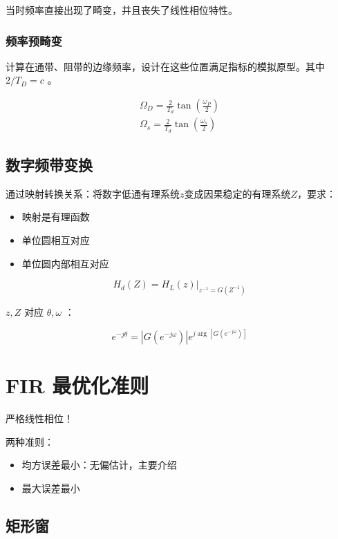 \documentclass[cn,11pt,chinese,black,simple]{elegantbook}
\begin{document}
当时频率直接出现了畸变，并且丧失了线性相位特性。

\subsubsection{频率预畸变}

计算在通带、阻带的边缘频率，设计在这些位置满足指标的模拟原型。其中 \( 2 / T_D = c\) 。

\[
    \begin{array}{l}
        \Omega_{D}=\frac{2}{T_{d}} \tan \left(\frac{\omega_{P}}{2}\right) \\
        \Omega_{s}=\frac{2}{T_{d}} \tan \left(\frac{\omega_{s}}{2}\right)
        \end{array}\]

\subsection{数字频带变换}

通过映射转换关系：将数字低通有理系统\(z\)变成因果稳定的有理系统\(Z\)，要求：

\begin{itemize}
    \item 映射是有理函数
    \item 单位圆相互对应
    \item 单位圆内部相互对应
\end{itemize}

\[
    H_{d}(Z)=\left.H_{L}(z)\right|_{z^{-1}=G\left(Z^{-1}\right)}\]

\(z, Z\) 对应 \(\theta, \omega\) ：

\[
e^{-j \theta}=\left|G\left(e^{-j \omega}\right)\right| e^{j \arg \left[G\left(e^{-j \omega}\right)\right]}
\]

\section{FIR 最优化准则} 

严格线性相位！

两种准则：

\begin{itemize}
    \item 均方误差最小：无偏估计，主要介绍
    \item 最大误差最小
\end{itemize}

\subsection{矩形窗}
\end{document}
